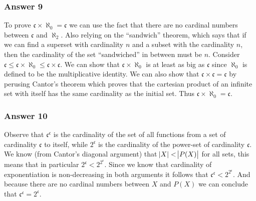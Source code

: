 \documentclass[11pt]{article}
\begin{document}
\subsubsection{Answer 9}
\label{sec-1-4-2}
To prove $\mathfrak{c} \times \aleph_0 = \mathfrak{c}$ we can use the fact
that there are no cardinal numbers between $\mathfrak{c}$ and $\aleph_2$.
Also relying on the ``sandwich'' theorem, which says that if we can find a
superset with cardinality $n$ and a subset with the cardinality $n$,
then the cardinality of the set ``sandwiched'' in between must be $n$.
Consider $\mathfrak{c} \leq \mathfrak{c} \times \aleph_0 \leq \mathfrak{c}
    \times \mathfrak{c}$.  We can show that $\mathfrak{c} \times \aleph_0$ is at
least as big as $\mathfrak{c}$ since $\aleph_0$ is defined to be the
multiplicative identity.  We can also show that $\mathfrak{c} \times
    \mathfrak{c} = \mathfrak{c}$ by perusing Cantor's theorem which proves that
the cartesian product of an infinite set with itself has the same cardinality
as the initial set.  Thus $\mathfrak{c} \times \aleph_0 = \mathfrak{c}$.
\subsubsection{Answer 10}
\label{sec-1-4-3}
Observe that $\mathfrak{c}^{\mathfrak{c}}$ is the cardinality of the set of
all functions from a set of cardinality $\mathfrak{c}$ to itself, while
$2^{\mathfrak{c}}$ is the cardinality of the power-set of cardinality
$\mathfrak{c}$.  We know (from Cantor's diagonal argument) that $\abs{X} <
    \abs{P(X)}$ for all sets, this means that in particular $2^{\mathfrak{c}} <
    2^{2^\mathfrak{c}}$.  Since we know that cardinality of exponentiation is
non-decreasing in both arguments it follows that $\mathfrak{c}^{
    \mathfrak{c}} < 2^{2^{\mathfrak{c}}}$.  And because there are no cardinal
numbers between $X$ and $P(X)$ we can conclude that
$\mathfrak{c}^{\mathfrak{c}} = 2^{\mathfrak{c}}$.
\end{document}
